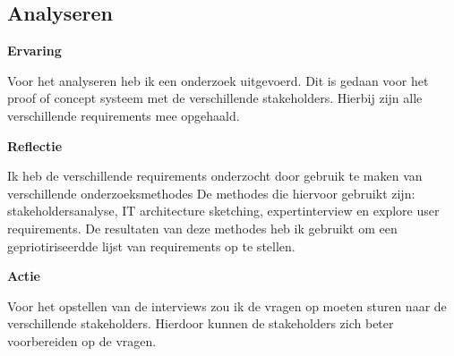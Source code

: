 \subsection{Analyseren}

\textbf{Ervaring}

\whitespace
Voor het analyseren heb ik een onderzoek uitgevoerd.
Dit is gedaan voor het proof of concept systeem met de verschillende stakeholders.
Hierbij zijn alle verschillende requirements mee opgehaald.

\whitespace
\textbf{Reflectie}

\whitespace
Ik heb de verschillende requirements onderzocht door gebruik te maken van verschillende onderzoeksmethodes
De methodes die hiervoor gebruikt zijn: stakeholdersanalyse, IT architecture sketching, expertinterview en explore user requirements.
De resultaten van deze methodes heb ik gebruikt om een gepriotiriseerdde lijst van requirements op te stellen.

\whitespace
\textbf{Actie}

\whitespace
Voor het opstellen van de interviews zou ik de vragen op moeten sturen naar de verschillende stakeholders.
Hierdoor kunnen de stakeholders zich beter voorbereiden op de vragen.
